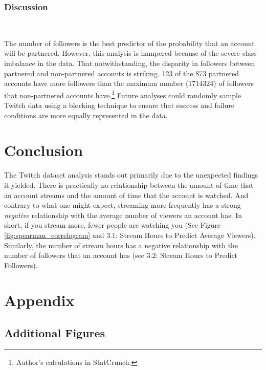 \documentclass[12pt]{article}
\begin{document}
\subsubsection{Discussion}\

The number of followers is the best predictor of the probability that an account will be partnered. However, this analysis is hampered because of the severe class imbalance in the data. That notwithstanding, the disparity in followers between partnered and non-partnered accounts is striking. 123 of the 873 partnered accounts have more followers than the maximum number (1714324) of followers that non-partnered accounts have.\footnote{Author's calculations in StatCrunch.} Future analyses could randomly sample Twitch data using a blocking technique to ensure that success and failure conditions are more equally represented in the data.


\section{Conclusion}

The Twitch dataset analysis stands out primarily due to the unexpected findings it yielded. There is practically no relationship between the amount of time that an account streams and the amount of time that the account is watched. And contrary to what one might expect, streaming more frequently has a strong \emph{negative} relationship with the average number of viewers an account has. In short, if you stream more, fewer people are watching you (See Figure \ref{fig:spearman_correlogram} and 3.1: Stream Hours to Predict Average Viewers). Similarly, the number of stream hours has a negative relationship with the number of followers that an account has (see 3.2: Stream Hours to Predict Followers). 












\newpage 

\section{Appendix}

\subsection{Additional Figures}
\end{document}
